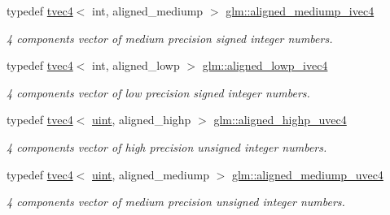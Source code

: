\begin{DoxyCompactItemize}
\mbox{\label{group__gtc__type__aligned_ga76b2981eb152332dd1404b00a15eac50}} 
typedef \hyperlink{structglm_1_1tvec4}{tvec4}$<$ int, aligned\+\_\+mediump $>$ \hyperlink{group__gtc__type__aligned_ga76b2981eb152332dd1404b00a15eac50}{glm\+::aligned\+\_\+mediump\+\_\+ivec4}
\begin{DoxyCompactList}\small\item\em 4 components vector of medium precision signed integer numbers. \end{DoxyCompactList}\item 
\mbox{\label{group__gtc__type__aligned_ga7605da765c208f1008519a167dddd6d9}} 
typedef \hyperlink{structglm_1_1tvec4}{tvec4}$<$ int, aligned\+\_\+lowp $>$ \hyperlink{group__gtc__type__aligned_ga7605da765c208f1008519a167dddd6d9}{glm\+::aligned\+\_\+lowp\+\_\+ivec4}
\begin{DoxyCompactList}\small\item\em 4 components vector of low precision signed integer numbers. \end{DoxyCompactList}\item 
\mbox{\label{group__gtc__type__aligned_ga15c8f3d51b9df35dbf8bf2276512588b}} 
typedef \hyperlink{structglm_1_1tvec4}{tvec4}$<$ \hyperlink{group__core__precision_ga4fd29415871152bfb5abd588334147c8}{uint}, aligned\+\_\+highp $>$ \hyperlink{group__gtc__type__aligned_ga15c8f3d51b9df35dbf8bf2276512588b}{glm\+::aligned\+\_\+highp\+\_\+uvec4}
\begin{DoxyCompactList}\small\item\em 4 components vector of high precision unsigned integer numbers. \end{DoxyCompactList}\item 
\mbox{\label{group__gtc__type__aligned_gadce20b2c78b77cf2f08bc9c31d1a822e}} 
typedef \hyperlink{structglm_1_1tvec4}{tvec4}$<$ \hyperlink{group__core__precision_ga4fd29415871152bfb5abd588334147c8}{uint}, aligned\+\_\+mediump $>$ \hyperlink{group__gtc__type__aligned_gadce20b2c78b77cf2f08bc9c31d1a822e}{glm\+::aligned\+\_\+mediump\+\_\+uvec4}
\begin{DoxyCompactList}\small\item\em 4 components vector of medium precision unsigned integer numbers. \end{DoxyCompactList}\item 

\end{DoxyCompactItemize}
